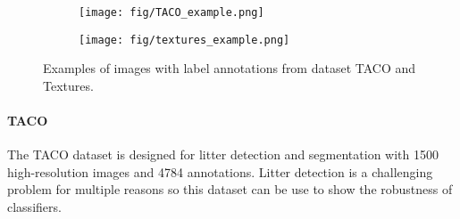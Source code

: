 \begin{figure}[h!]
\centering
\begin{subfigure}[b]{0.4\linewidth}
    \texttt{[image: fig/TACO\_example.png]}
\end{subfigure}
\begin{subfigure}[b]{0.4\linewidth}
    \texttt{[image: fig/textures\_example.png]}
\end{subfigure}
\caption{Examples of images with label annotations from dataset TACO and Textures.}
\label{fig:coco_pascal}
\end{figure}

\paragraph{TACO}\cite{proencaTACOTrashAnnotations2020}
The TACO dataset is designed for litter detection and segmentation 
with 1500 high-resolution images and 4784 annotations. 
Litter detection is a challenging problem for multiple reasons so this dataset can be use to show the robustness of classifiers. 

